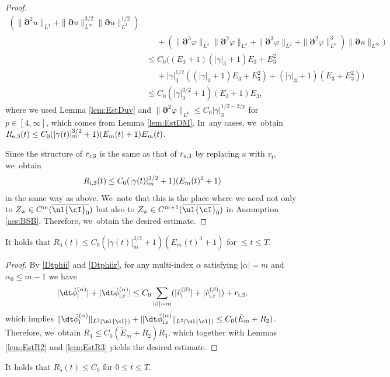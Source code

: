 \begin{proof}
\begin{align*}
(\|\bm{\partial}^2u\|_{L^4} + \|\bm{\partial}u\|_{L^\infty}^{3/2}\|\bm{\partial}u\|_{L^2}^{1/2}) \\
&\quad\;
+ (\|\bm{\partial}^3\varphi\|_{L^4}\|\bm{\partial}^2\varphi\|_{L^4} + \|\bm{\partial}^3\varphi\|_{L^2} + \|\bm{\partial}^2\varphi\|_{L^6}^3)
\|\bm{\partial}u\|_{L^\infty} \Bigr) \\
&\leq C_0 \bigl((E_3+1)(|\gamma|_3+1)E_3 + E_3^2 \\
&\quad\;
+ |\gamma|_3^{1/2}((|\gamma|_3+1)E_3 + E_3^2) + (|\gamma|_3+1)(E_3 + E_3^2) \bigr) \\
&\leq C_0(|\gamma|_3^{3/2}+1)(E_3+1)E_3,
\end{align*}
where we used Lemma \ref{lem:EstDuv} and $\|\bm{\partial}^2\varphi\|_{L^p} \leq C_0|\gamma|_3^{1/2-2/p}$ for $p\in[4,\infty]$,
which comes from Lemma \ref{lem:EstDM}. In~any cases, we~obtain $R_{{\rm e},3}(t) \leq C_0(|\gamma(t)|_m^{3/2}+1)(E_m(t)+1)E_m(t)$.

Since the structure of $r_{{\rm i},3}$ is the same as that of $r_{{\rm e},3}$ by replacing $u$ with $v_\mathrm{i}$, we~obtain
\[
R_{{\rm i},3}(t) \leq C_0(|\gamma(t)|_m^{3/2}+1)(E_m(t)^2+1)
\]
in the same way as above. We~note that this is the place where we need not only to $Z_\mathrm{w}\in C^m(\overline{\ul{\cI}_0})$
but also to $Z_\mathrm{w}\in C^{m+1}(\overline{\ul{\cI}_0})$ in Assumption \ref{ass:BSB}.
Therefore, we~obtain the desired estimate.
\end{proof}

\begin{lemma}\label{lem:EstR4}
It holds that $R_4(t) \leq C_0(|\gamma(t)|_m^{3/2}+1)(E_m(t)^3+1)$ for $\leq t\leq T$.
\end{lemma}

\begin{proof}
By \eqref{Dtphii} and \eqref{Dtphiir}, for any multi-index $\alpha$ satisfying $|\alpha|=m$ and $\alpha_0\leq m-1$ we have
\[
|\dt\check{\phi}_\mathrm{i}^{(\alpha)}| + |\dt\check{\phi}_\mathrm{i,r}^{(\alpha)}|
\leq C_0\sum_{|\beta|=m} (|\check{v}_\mathrm{i}^{(\beta)}| + |\check{v}_\mathrm{i,r}^{(\beta)}|) + r_{{\rm i},2},
\]
which implies
$\|\dt\check{\phi}_\mathrm{i}^{(\alpha)}\|_{L^2(\ul{\cI})} + \|\dt\check{\phi}_\mathrm{i,r}^{(\alpha)}\|_{L^2(\ul{\cI})}\leq C_0(\check{E}_m + R_2)$.
Therefore, we~obtain $R_4 \leq C_0 (\check{E}_m + R_2)R_3$, which together with Lemmas \ref{lem:EstR2} and \ref{lem:EstR3} yields the desired estimate.
\end{proof}

\begin{lemma}\label{lem:EstR5}
It holds that $R_5(t) \leq C_0$ for $0\leq t\leq T$.
\end{lemma}

